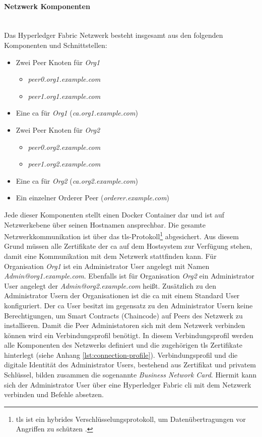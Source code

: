 \paragraph{Netzwerk Komponenten}$~~$\\
Das Hyperledger Fabric Netzwerk besteht insgesamt aus den folgenden Komponenten und Schnittstellen:

\begin{itemize}
    \item Zwei Peer Knoten für \textit{Org1}
    \begin{itemize}
        \item \textit{peer0.org1.example.com}
        \item \textit{peer1.org1.example.com}
    \end{itemize}
    \item Eine \ac{ca} für \textit{Org1} (\textit{ca.org1.example.com})
    \item Zwei Peer Knoten für \textit{Org2}
    \begin{itemize}
        \item \textit{peer0.org2.example.com}
        \item \textit{peer1.org2.example.com}
    \end{itemize}
    \item Eine \ac{ca} für \textit{Org2} (\textit{ca.org2.example.com})
    \item Ein einzelner Orderer Peer (\textit{orderer.example.com})
\end{itemize}

\noindent
Jede dieser Komponenten stellt einen Docker Container dar und ist auf Netzwerkebene über seinen Hostnamen ansprechbar. Die gesamte Netzwerkkommunikation ist über das \ac{tls}-Protokoll\footnote{\ac{tls} ist ein hybrides Verschlüsselungsprotokoll, um Datenübertragungen vor Angriffen zu schützen \citep{RFC5246}.} abgesichert. Aus diesem Grund müssen alle Zertifikate der \ac{ca} auf dem Hostsystem zur Verfügung stehen, damit eine Kommunikation mit dem Netzwerk stattfinden kann. Für Organisation \textit{Org1} ist ein Administrator User angelegt mit Namen \textit{Admin@org1.example.com}. Ebenfalls ist für Organisation \textit{Org2} ein Administrator User angelegt der \textit{Admin@org2.example.com} heißt. Zusätzlich zu den Administrator Usern der Organisationen ist die \ac{ca} mit einem Standard User konfiguriert. Der \ac{ca} User besitzt im gegensatz zu den Administrator Usern keine Berechtigungen, um Smart Contracts (Chaincode) auf Peers des Netzwerk zu installieren. Damit die Peer Administatoren sich mit dem Netzwerk verbinden können wird ein Verbindungsprofil benötigt. In diesem Verbindungsprofil werden alle Komponenten des Netzwerks definiert und die zugehörigen \ac{tls} Zertifikate hinterlegt (siehe Anhang \ref{lst:connection-profile}). Verbindungsprofil und die digitale Identität des Administrator Users, bestehend aus Zertifikat und privatem Schlüssel, bilden zusammen die sogenannte \textit{Business Network Card}. Hiermit kann sich der Administrator User über eine Hyperledger Fabric \ac{cli} mit dem Netzwerk verbinden und Befehle absetzen.

